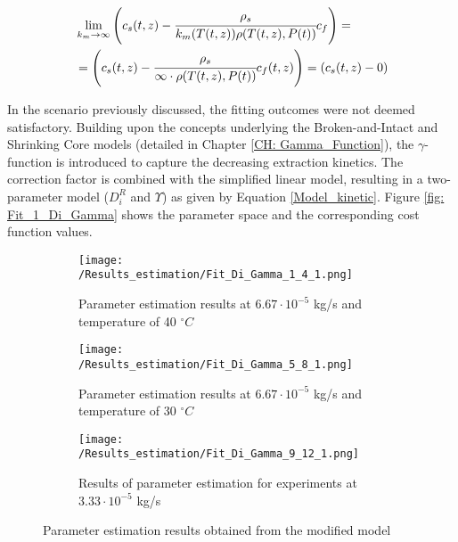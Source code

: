 \documentclass[../Supercritical_fluid_extraction_of_essential_oil_from_chamomile.tex]{subfiles}
\begin{document}
	{\footnotesize
		\begin{equation*}
			\begin{split}
				&\lim_{k_m \rightarrow \infty} \left({\color{black}{\color{black} c_s} }(t,z)  - \cfrac{{\color{black}\rho_s}}{{\color{black}k_m}(T(t,z)){\color{black}\rho}(T(t,z),{\color{black}P}(t))}  c_f \right)  = \\
				&= \left({\color{black}{\color{black} c_s} }(t,z)  - \cfrac{\rho_s}{\infty \cdot \rho(T(t,z),P(t))}  {c_f}(t,z) \right) = \left(c_s(t,z) - 0 \right)
			\end{split}
	\end{equation*} }
	
	In the scenario previously discussed, the fitting outcomes were not deemed satisfactory. Building upon the concepts underlying the Broken-and-Intact and Shrinking Core models (detailed in Chapter \ref{CH: Gamma_Function}), the $\gamma$-function is introduced to capture the decreasing extraction kinetics. The correction factor is combined with the simplified linear model, resulting in a two-parameter model ($D_i^R$ and $\Upsilon$) as given by Equation \ref{Model_kinetic}. Figure \ref{fig: Fit_1_Di_Gamma} shows the parameter space and the corresponding cost function values.
		
	\begin{figure}[!h]
		\centering
		\begin{subfigure}{0.9\columnwidth}
			\centering
			\texttt{[image: /Results\_estimation/Fit\_Di\_Gamma\_1\_4\_1.png]}
			\caption{Parameter estimation results at $6.67\cdot 10^{-5}$ kg/s and temperature of 40 $^\circ C$}
			\label{fig: Fit_1_4_Di_Gamma}
		\end{subfigure}
		\hfill
		\begin{subfigure}{0.9\columnwidth}
			\centering
			\texttt{[image: /Results\_estimation/Fit\_Di\_Gamma\_5\_8\_1.png]}
			\caption{Parameter estimation results at $6.67\cdot 10^{-5}$ kg/s and temperature of 30 $^\circ C$}
			\label{fig: Fit_5_8_Di_Gamma}
		\end{subfigure}
		\hfill
		\begin{subfigure}{0.9\columnwidth}
			\centering
			\texttt{[image: /Results\_estimation/Fit\_Di\_Gamma\_9\_12\_1.png]}
			\caption{Results of parameter estimation for experiments at $3.33\cdot 10^{-5}$ kg/s}
			\label{fig: Fit_9_12_Di_Gamma}
		\end{subfigure}
		\caption{Parameter estimation results obtained from the modified model}
		\label{fig: Fit_Di_Gamma}
	\end{figure}
	
\end{document}
